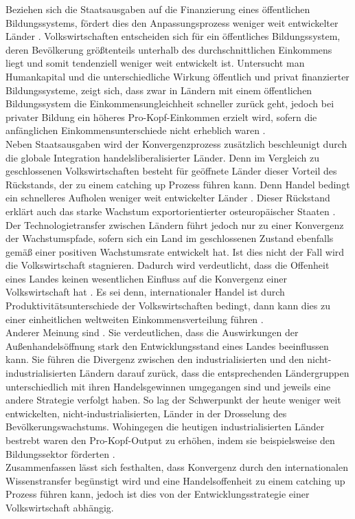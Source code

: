 Beziehen sich die Staatsausgaben auf die Finanzierung eines {\"o}ffentlichen Bildungssystems, f{\"o}rdert dies den Anpassungsprozess weniger weit entwickelter L{\"a}nder \citep{Glomm.1992}. Volkswirtschaften entscheiden sich f{\"u}r ein {\"o}ffentliches Bildungssystem, deren Bev{\"o}lkerung gr{\"o}{\ss}tenteils unterhalb des durchschnittlichen Einkommens liegt und somit tendenziell weniger weit entwickelt ist.
Untersucht man Humankapital und die unterschiedliche Wirkung {\"o}ffentlich und privat finanzierter Bildungssysteme, zeigt sich, dass zwar in L{\"a}ndern mit einem {\"o}ffentlichen Bildungssystem die Einkommensungleichheit schneller zur{\"u}ck geht, jedoch bei privater Bildung ein h{\"o}heres Pro-Kopf-Einkommen erzielt wird, sofern die anf{\"a}nglichen Einkommensunterschiede nicht erheblich waren \citep{Glomm.1992}.\\
Neben Staatsausgaben wird der Konvergenzprozess zus{\"a}tzlich beschleunigt durch die globale Integration handelsliberalisierter L{\"a}nder. Denn im Vergleich zu geschlossenen Volkswirtschaften  besteht f{\"u}r ge{\"o}ffnete L{\"a}nder dieser Vorteil des R{\"u}ckstands, der zu einem catching up Prozess f{\"u}hren kann. Denn Handel bedingt ein schnelleres Aufholen weniger weit entwickelter L{\"a}nder \citep{Sachs.1995}. Dieser R{\"u}ckstand erkl{\"a}rt auch das starke Wachstum exportorientierter osteurop{\"a}ischer Staaten \citep{Ventura.1997}.\\
Der Technologietransfer zwischen L{\"a}ndern f{\"u}hrt jedoch nur zu einer Konvergenz der Wachstumspfade, sofern sich ein Land im geschlossenen Zustand ebenfalls gem{\"a}{\ss} einer positiven Wachstumsrate entwickelt hat. Ist dies nicht der Fall wird die Volkswirtschaft stagnieren. Dadurch wird verdeutlicht, dass die Offenheit eines Landes keinen wesentlichen Einfluss auf die Konvergenz einer Volkswirtschaft hat \citep{Howitt.2000}. 
Es sei denn, internationaler Handel ist durch Produktivit{\"a}tsunterschiede der Volkswirtschaften bedingt, dann kann dies zu einer einheitlichen weltweiten Einkommensverteilung f{\"u}hren \citep{Howitt.2000,Acemoglu.2002,Eaton.2001}.\\
Anderer Meinung sind \citet{Galor.2006,Galor.2008}. Sie verdeutlichen, dass die Auswirkungen der Au{\ss}enhandels{\"o}ffnung stark den Entwicklungsstand eines Landes beeinflussen kann. Sie f{\"u}hren die Divergenz zwischen den industrialisierten und den nicht-industrialisierten L{\"a}ndern darauf zur{\"u}ck, dass die entsprechenden L{\"a}ndergruppen unterschiedlich mit ihren Handelsgewinnen umgegangen sind und jeweils eine andere Strategie verfolgt haben. So lag der Schwerpunkt der heute weniger weit entwickelten, nicht-industrialisierten, L{\"a}nder in der Drosselung des Bev{\"o}lkerungswachstums. Wohingegen die heutigen industrialisierten L{\"a}nder bestrebt waren den Pro-Kopf-Output zu erh{\"o}hen, indem sie beispielsweise den Bildungssektor f{\"o}rderten \cite{Galor.2006}.\\
Zusammenfassen l{\"a}sst sich festhalten, dass Konvergenz durch den internationalen Wissenstransfer beg{\"u}nstigt wird und eine Handelsoffenheit zu einem catching up Prozess f{\"u}hren kann, jedoch ist dies von der Entwicklungsstrategie einer Volkswirtschaft abh{\"a}ngig. 

